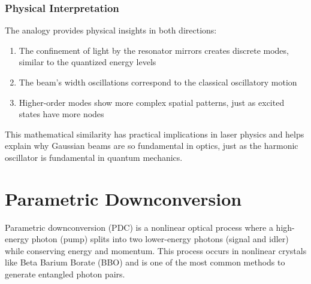 \documentclass[
  a4paper,
]{book}
\providecommand{\tightlist}{%
  \setlength{\itemsep}{0pt}\setlength{\parskip}{0pt}}
\begin{document}
\begin{tcolorbox}
\begin{figure}[H]
\end{figure}%

\subsection{Physical Interpretation}\label{physical-interpretation-1}

The analogy provides physical insights in both directions:

\begin{enumerate}
\def\labelenumi{\arabic{enumi}.}
\tightlist
\item
  The confinement of light by the resonator mirrors creates discrete
  modes, similar to the quantized energy levels
\item
  The beam's width oscillations correspond to the classical oscillatory
  motion
\item
  Higher-order modes show more complex spatial patterns, just as excited
  states have more nodes
\end{enumerate}

This mathematical similarity has practical implications in laser physics
and helps explain why Gaussian beams are so fundamental in optics, just
as the harmonic oscillator is fundamental in quantum mechanics.

\end{tcolorbox}

\chapter{Parametric Downconversion}\label{parametric-downconversion}

Parametric downconversion (PDC) is a nonlinear optical process where a
high-energy photon (pump) splits into two lower-energy photons (signal
and idler) while conserving energy and momentum. This process occurs in
nonlinear crystals like Beta Barium Borate (BBO) and is one of the most
common methods to generate entangled photon pairs.
\end{document}
